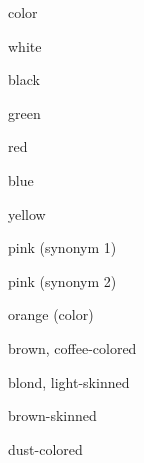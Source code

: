 

\begin{flashcard}{\LARGE color}
\LARGE {}
\end{flashcard}
\begin{flashcard}{\LARGE white}
\LARGE {}
\end{flashcard}
\begin{flashcard}{\LARGE black}
\LARGE {}
\end{flashcard}
\begin{flashcard}{\LARGE green}
\LARGE {}
\end{flashcard}
\begin{flashcard}{\LARGE red}
\LARGE {}
\end{flashcard}
\begin{flashcard}{\LARGE blue}
\LARGE {}
\end{flashcard}
\begin{flashcard}{\LARGE yellow}
\LARGE {}
\end{flashcard}
\begin{flashcard}{\LARGE pink (synonym 1)}
\LARGE {}
\end{flashcard}
\begin{flashcard}{\LARGE pink (synonym 2)}
\LARGE {}
\end{flashcard}
\begin{flashcard}{\LARGE orange (color)}
\LARGE {}
\end{flashcard}
\begin{flashcard}{\LARGE brown, coffee-colored}
\LARGE {}
\end{flashcard}
\begin{flashcard}{\LARGE blond, light-skinned}
\LARGE {}
\end{flashcard}
\begin{flashcard}{\LARGE brown-skinned}
\LARGE {}
\end{flashcard}
\begin{flashcard}{\LARGE dust-colored}
\LARGE {}
\end{flashcard}

